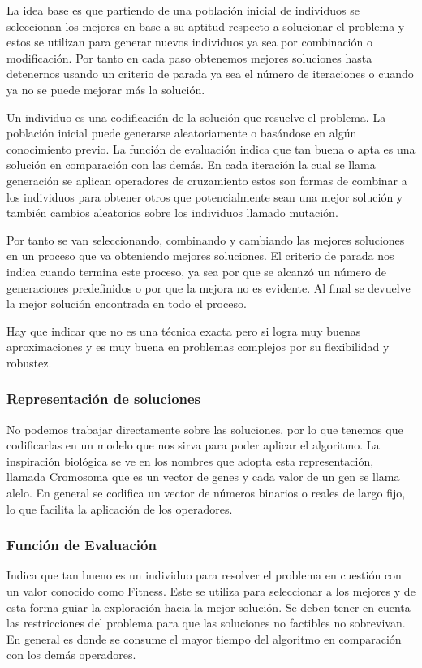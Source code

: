 La idea base es que partiendo de una población inicial de individuos se seleccionan los mejores en base a su aptitud respecto a solucionar el problema y estos se utilizan para generar nuevos individuos ya sea por combinación o modificación. Por tanto en cada paso obtenemos mejores soluciones hasta detenernos usando un criterio de parada ya sea el número de iteraciones o cuando ya no se puede mejorar más la solución.

Un individuo es una codificación de la solución que resuelve el problema.
La población inicial puede generarse aleatoriamente o basándose en algún conocimiento previo.
La función de evaluación indica que tan buena o apta es una solución en comparación con las demás.
En cada iteración la cual se llama generación se aplican operadores de cruzamiento estos son formas de combinar a los individuos para obtener otros que potencialmente sean una mejor solución y también cambios aleatorios sobre los individuos llamado mutación.

Por tanto se van seleccionando, combinando y cambiando las mejores soluciones en un proceso que va obteniendo mejores soluciones.
El criterio de parada nos indica cuando termina este proceso, ya sea por que se alcanzó un número de generaciones predefinidos o por que la mejora no es evidente. Al final se devuelve la mejor solución encontrada en todo el proceso.

Hay que indicar que no es una técnica exacta pero si logra muy buenas aproximaciones y es muy buena en problemas complejos por su flexibilidad y robustez. 


\subsubsection{Representación de soluciones}
No podemos trabajar directamente sobre las soluciones, por lo que tenemos que codificarlas en un modelo que nos sirva para poder aplicar el algoritmo.
La inspiración biológica se ve en los nombres que adopta esta representación, llamada Cromosoma que es un vector de genes y cada valor de un gen se llama alelo.
En general se codifica un vector de números binarios o reales de largo fijo, lo que facilita la aplicación de los operadores.

\subsubsection{Función de Evaluación} 
Indica que tan bueno es un individuo para resolver el problema en cuestión con un valor conocido como Fitness. Este se utiliza para seleccionar a los mejores y de esta forma guiar la exploración hacia la mejor solución.
Se deben tener en cuenta las restricciones del problema para que las soluciones no factibles no sobrevivan.
En general es donde se consume el mayor tiempo del algoritmo en comparación con los demás operadores.

